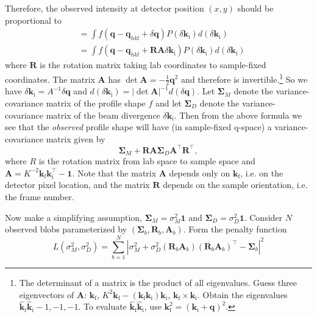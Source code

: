 \documentclass[11pt,a4paper]{article}
\let\oldhat\hat
\renewcommand{\hat}[1]{\oldhat{\mathbf{#1}}}
\def\v#1{\bm{{#1}}}
\def\tr{^\intercal}
\def\si{\text{i}}
\def\sf{\text{f}}
\def\k{{\v{k}}}
\def\hk{{\v{\hat k}}}
\def\q{{\v{q}}}
\begin{document}
Therefore, the observed intensity at detector position $(x,y)$ should be proportional to
\begin{align}
  &= \int f(\q - \q_{hkl} + \delta \q) P(\delta \k_\si) d(\delta \k_\si) \\
  &= \int f(\q - \q_{hkl} + \v{R}\v{A} \delta \k_\si) P(\delta \k_\si) d(\delta \k_\si)
\end{align}
where $\v{R}$ is the rotation matrix taking lab coordinates to sample-fixed coordinates.
The matrix $\v{A}$ has $\det \v{A} = -\frac{1}{2}\q^2$
and therefore is invertible.\footnote
{The determinant of a matrix is the product of all eigenvalues.
Guess three eigenvectors of $\v{A}$:
$\k_\sf$, $K^2\k_\sf-(\k_\sf\k_\si)\k_\si$, $\k_\sf\times\k_\si$.
Obtain the eigenvalues $\hk_\sf\hk_\si-1,-1,-1$.
To evaluate $\hk_\sf\hk_\si$, use $\k_\sf^2=(\k_\si+\q)^2$.}
So we have
$\delta \k_\si = A^{-1} \delta \q$ and $d(\delta \k_\si) = |\det \v{A}|^{-1} d(\delta \q)$.
Let $\v\Sigma_M$ denote the variance-covariance matrix of the profile shape $f$
and let $\v\Sigma_D$ denote the variance-covariance matrix of the beam divergence $\delta \k_\si$.
Then from the above formula we see that the \emph{observed} profile shape will have
(in sample-fixed q-space) a variance-covariance matrix given by
\begin{equation}
  \v\Sigma_M + \v{R} \v{A} \v\Sigma_D \v{A}\tr \v{R}\tr,
\end{equation}
where $R$ is the rotation matrix from lab space to sample space
and $\v{A} = K^{-2} \k_\sf \k_\si\tr - \v1$.
Note that the matrix $\v{A}$ depends only on $\k_\sf$, i.e. on the detector pixel location,
and the matrix $\v{R}$ depends on the sample orientation, i.e. the frame number.

Now make a simplifying assumption,
$\v\Sigma_M = \sigma_M^2 \v1$ and $\v\Sigma_D = \sigma_D^2 \v1$.
Consider $N$ observed blobs parameterized by $(\v\Sigma_b, \v{R}_b, \v{A}_b)$.
Form the penalty function
\begin{equation}
  L(\sigma_M^2, \sigma_D^2)
  = \sum_{b=1}^N
    \left|\sigma_M^2 + \sigma_D^2 (\v{R}_b \v{A}_b)(\v{R}_b\v{A}_b)\tr - \v\Sigma_b\right|^2
\end{equation}
\end{document}
